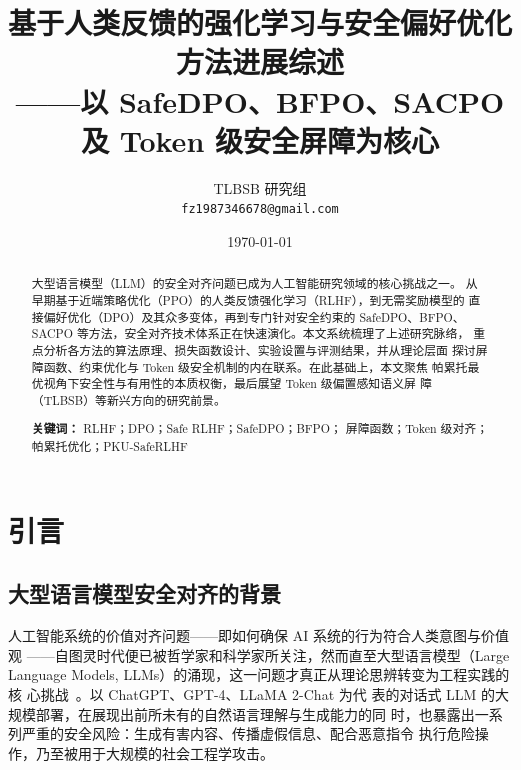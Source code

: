 \documentclass[12pt,a4paper,UTF8]{ctexart}
\begin{document}

\title{
  \vspace{-1cm}
  {\Large \textbf{基于人类反馈的强化学习与安全偏好优化方法进展综述}}\\[0.6em]
  {\large ——以 SafeDPO、BFPO、SACPO 及 Token 级安全屏障为核心}
}

\author{
  TLBSB 研究组\\
  \small \texttt{fz1987346678@gmail.com}
}
\date{\today}

\maketitle
\thispagestyle{fancy}

\begin{abstract}
大型语言模型（LLM）的安全对齐问题已成为人工智能研究领域的核心挑战之一。
从早期基于近端策略优化（PPO）的人类反馈强化学习（RLHF），到无需奖励模型的
直接偏好优化（DPO）及其众多变体，再到专门针对安全约束的 SafeDPO、BFPO、
SACPO 等方法，安全对齐技术体系正在快速演化。本文系统梳理了上述研究脉络，
重点分析各方法的算法原理、损失函数设计、实验设置与评测结果，并从理论层面
探讨屏障函数、约束优化与 Token 级安全机制的内在联系。在此基础上，本文聚焦
帕累托最优视角下安全性与有用性的本质权衡，最后展望 Token 级偏置感知语义屏
障（TLBSB）等新兴方向的研究前景。

\noindent\textbf{关键词：} RLHF；DPO；Safe RLHF；SafeDPO；BFPO；
屏障函数；Token 级对齐；帕累托优化；PKU-SafeRLHF
\end{abstract}

\tableofcontents
\newpage

\section{引言}

\subsection{大型语言模型安全对齐的背景}

人工智能系统的价值对齐问题——即如何确保 AI 系统的行为符合人类意图与价值观
——自图灵时代便已被哲学家和科学家所关注，然而直至大型语言模型（Large
Language Models, LLMs）的涌现，这一问题才真正从理论思辨转变为工程实践的核
心挑战~\cite{ouyang2022instructgpt}。以 ChatGPT、GPT-4、LLaMA 2-Chat 为代
表的对话式 LLM 的大规模部署，在展现出前所未有的自然语言理解与生成能力的同
时，也暴露出一系列严重的安全风险：生成有害内容、传播虚假信息、配合恶意指令
执行危险操作，乃至被用于大规模的社会工程学攻击。
\end{document}
